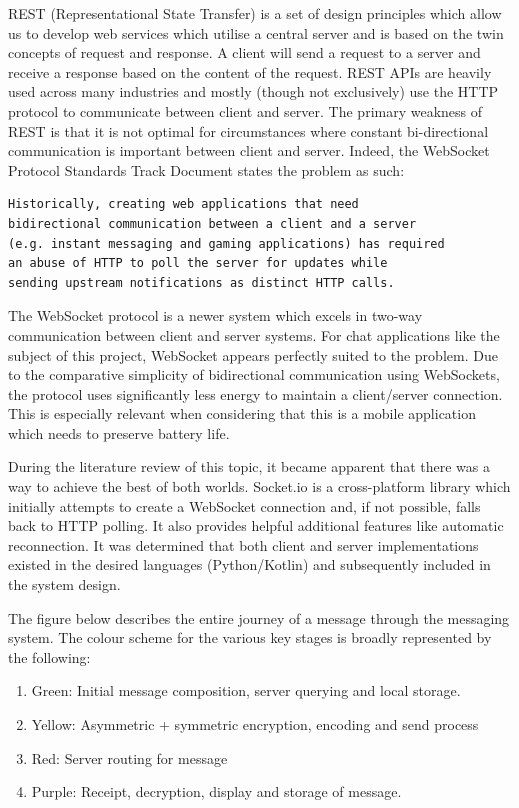 \documentclass{mproj}
\begin{document}
REST (Representational State Transfer) is a set of design principles which allow us to develop web services which utilise a central server and is based on the twin concepts of request and response. A client will send a request to a server and receive a response based on the content of the request. REST APIs are heavily used across many industries and mostly (though not exclusively) use the HTTP protocol to communicate between client and server. The primary weakness of REST is that it is not optimal for circumstances where constant bi-directional communication is important between client and server. Indeed, the WebSocket Protocol Standards Track Document\cite{fette2011websocket} states the problem as such:

\begin{verbatim}
Historically, creating web applications that need 
bidirectional communication between a client and a server 
(e.g. instant messaging and gaming applications) has required 
an abuse of HTTP to poll the server for updates while
sending upstream notifications as distinct HTTP calls.
\end{verbatim}

The WebSocket protocol is a newer system which excels in two-way communication between client and server systems. For chat applications like the subject of this project, WebSocket appears perfectly suited to the problem.  
Due to the comparative simplicity of bidirectional communication using WebSockets, the protocol uses significantly less energy\cite{herwig2015assessment} to maintain a client/server connection. This is especially relevant when considering that this is a mobile application which needs to preserve battery life. 

During the literature review of this topic, it became apparent that there was a way to achieve the best of both worlds. Socket.io\cite{rai2013socket} is a cross-platform library which initially attempts to create a WebSocket connection and, if not possible, falls back to HTTP polling. It also provides helpful additional features like automatic reconnection. It was determined that both client and server implementations existed in the desired languages (Python/Kotlin) and subsequently included in the system design.

The figure below describes the entire journey of a message through the messaging system. The colour scheme for the various key stages is broadly represented by the following:
\begin{enumerate}
	\item Green: Initial message composition, server querying and local storage.
	\item Yellow: Asymmetric + symmetric encryption, encoding and send process
	\item Red: Server routing for message
	\item Purple: Receipt, decryption, display and storage of message.
\end{enumerate}
\end{document}
